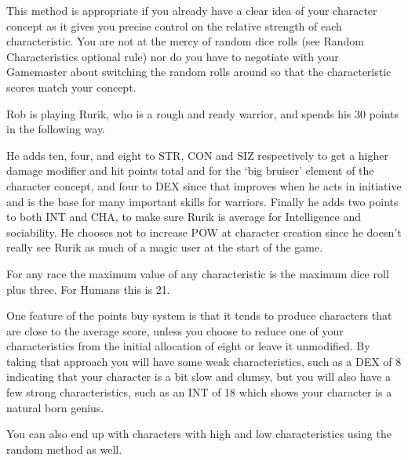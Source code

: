 This method is appropriate if you already have a clear idea of your character concept as it gives you precise control on the relative strength of each characteristic. You are not at the mercy of random dice rolls (see Random Characteristics optional rule) nor do you have to negotiate with your Gamemaster about switching the random rolls around so that the characteristic scores match your concept.

\begin{rpg-examplebox}
Rob is playing Rurik, who is a rough and ready warrior, and spends his 30 points in the following way.

	\stats[STR=18, CON=12, DEX=12, SIZ=16, INT=10, POW=8, CHA=10]

He adds ten, four, and eight to STR, CON and SIZ respectively to get a higher damage modifier and hit points total and for the ‘big bruiser’ element of the character concept, and four to DEX since that improves when he acts in initiative and is the base for many important skills for warriors. Finally he adds two points to both INT and CHA, to make sure Rurik is average for Intelligence and sociability. He chooses not to increase POW at character creation since he doesn’t really see Rurik as much of a magic user at the start of the game.
\end{rpg-examplebox}

For any race the maximum value of any characteristic is the maximum dice roll plus three. For Humans this is 21.

One feature of the points buy system is that it tends to produce characters that are close to the average score, unless you choose to reduce one of your characteristics from the initial allocation of eight or leave it unmodified. By taking that approach you will have some weak characteristics, such as a DEX of 8 indicating that your character is a bit slow and clumsy, but you will also have a few strong characteristics, such as an INT of 18 which shows your character is a natural born genius. 

You can also end up with characters with high and low characteristics using the random method as well.


